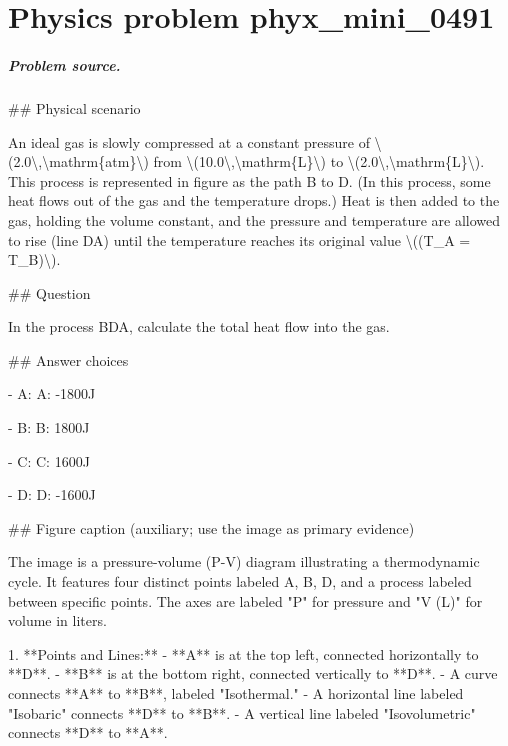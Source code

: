 
\chapter{Physics problem phyx\_mini\_0491}
\label{ch:PhyXMiniProblems_problem_phyx_mini_0491}

\paragraph{Problem source.}
\#\# Physical scenario

An ideal gas is slowly compressed at a constant pressure of \textbackslash{}(2.0\textbackslash{},\textbackslash{}mathrm\{atm\}\textbackslash{}) from \textbackslash{}(10.0\textbackslash{},\textbackslash{}mathrm\{L\}\textbackslash{}) to \textbackslash{}(2.0\textbackslash{},\textbackslash{}mathrm\{L\}\textbackslash{}). This process is represented in figure as the path B to D. (In this process, some heat flows out of the gas and the temperature drops.) Heat is then added to the gas, holding the volume constant, and the pressure and temperature are allowed to rise (line DA) until the temperature reaches its original value \textbackslash{}((T\_A = T\_B)\textbackslash{}).

\#\# Question

In the process BDA, calculate the total heat flow into the gas.

\#\# Answer choices

- A: A: -1800J

- B: B: 1800J

- C: C: 1600J

- D: D: -1600J

\#\# Figure caption (auxiliary; use the image as primary evidence)

The image is a pressure-volume (P-V) diagram illustrating a thermodynamic cycle. It features four distinct points labeled A, B, D, and a process labeled between specific points. The axes are labeled "P" for pressure and "V (L)" for volume in liters.

1. **Points and Lines:**
   - **A** is at the top left, connected horizontally to **D**.
   - **B** is at the bottom right, connected vertically to **D**.
   - A curve connects **A** to **B**, labeled "Isothermal."
   - A horizontal line labeled "Isobaric" connects **D** to **B**.
   - A vertical line labeled "Isovolumetric" connects **D** to **A**.


